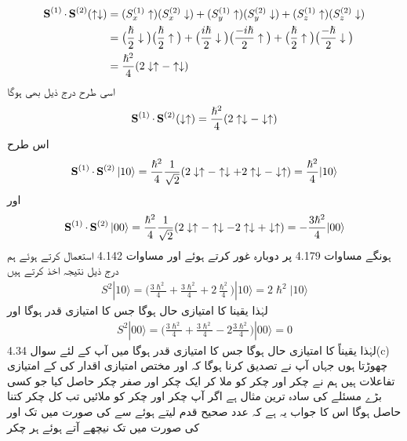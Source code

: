 \begin{align*}
\operatorname{\mathbf{S}}^{(1)} \cdot \operatorname{\mathbf{S}}^{(2)} (\uparrow \downarrow) &= (S_x^{(1)} \uparrow) (S_x^{(2)} \downarrow) + (S_y^{(1)} \uparrow) (S_y^{(2)} \downarrow) + (S_z^{(1)} \uparrow) (S_z^{(2)} \downarrow) \\
&= \big ( \frac{\hslash}{2} \downarrow \big ) \big ( \frac{\hslash}{2} \uparrow \big ) + \big ( \frac{i \hslash}{2} \downarrow \big ) \big ( \frac{- i \hslash}{2} \uparrow \big ) + \big ( \frac{\hslash}{2} \uparrow \big ) \big ( \frac{- \hslash}{2} \downarrow \big ) \\
&= \frac{\hslash^2}{4} (2 \downarrow \uparrow - \uparrow \downarrow)
\end{align*}
اسی طرح درج ذیل بھی ہوگا 
\begin{align*}
\operatorname{\mathbf{S}}^{(1)} \cdot \operatorname{\mathbf{S}}^{(2)} (\downarrow \uparrow) = \frac{\hslash^2}{4} (2 \uparrow \downarrow - \downarrow \uparrow)
\end{align*}
اس طرح 
\begin{align}
\operatorname{\mathbf{S}}^{(1)} \cdot \operatorname{\mathbf{S}}^{(2)} | 1 0 \rangle = \frac{\hslash^2}{4} \frac{1}{\sqrt{2}} (2 \downarrow \uparrow - \uparrow \downarrow + 2 \uparrow \downarrow - \downarrow \uparrow) = \frac{\hslash^2}{4} | 1 0 \rangle
\end{align}
اور
\begin{align}
\operatorname{\mathbf{S}}^{(1)} \cdot \operatorname{\mathbf{S}}^{(2)} | 0 0 \rangle = \frac{\hslash^2}{4} \frac{1}{\sqrt{2}} (2 \downarrow \uparrow - \uparrow \downarrow - 2 \uparrow \downarrow + \downarrow \uparrow) = -\frac{3\hslash^2}{4} | 0 0 \rangle
\end{align}
ہونگے مساوات 4.179 پر دوبارہ غور کرتے ہوئے اور مساوات 4.142 استعمال کرتے ہوئے ہم درج ذیل نتیجہ اخذ کرتے ہیں 
\begin{align}
S^2 | 1 0 \rangle = \big ( \frac{3\hslash^2}{4} + \frac{3\hslash^2}{4} +2 \frac{ \hslash^2}{4} \big ) | 1 0 \rangle =2\hslash^2 |1 0\rangle
\end{align}
لہٰذا  یقینا  کا امتیازی حال ہوگا جس کا امتیازی قدر  ہوگا اور 
\begin{align}
S^2 | 0 0 \rangle = \big ( \frac{3\hslash^2}{4} + \frac{3\hslash^2}{4} -2 \frac{3 \hslash^2}{4} \big ) | 0 0 \rangle =0
\end{align}
 لہٰذا  یقیناً  کا امتیازی حال ہوگا جس کا امتیازی قدر  ہوگا میں آپ کے لئے سوال 4.34(c) چھوڑتا ہوں جہاں آپ نے تصدیق کرنا ہوگا کہ  اور  مختص امتیازی اقدار کی  کے امتیازی تفاعلات ہیں ہم نے  چکر اور  چکر کو ملا کر ایک چکر اور صفر چکر حاصل کیا جو کسی بڑے مسئلے کی سادہ ترین مثال ہے اگر آپ  چکر اور  چکر کو ملائیں تب کل چکر  کتنا حاصل ہوگا اس کا جواب یہ ہے کہ عدد صحیح قدم لیتے ہوئے  سے  کی صورت میں  تک اور  کی صورت میں  تک نیچھے آتے ہوئے  ہر چکر 
